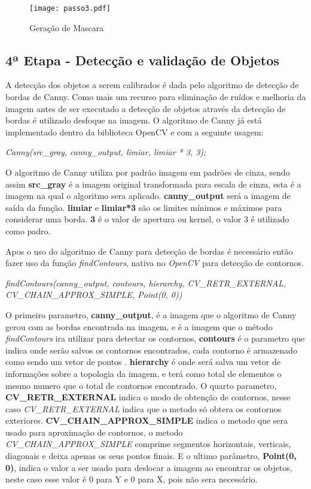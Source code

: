 \begin{figure}[H]
			\centering
			\texttt{[image: passo3.pdf]}
			\caption{Geração de Mascara}
			\label{Configuracao}
		\end{figure}		


\subsection{4ª Etapa - Detecção e validação de Objetos}
A detecção dos objetos a serem calibrados é dada pelo algoritmo de detecção de bordas de Canny. Como mais um recurso para eliminação de ruídos e melhoria da imagem antes de ser executado a detecção de objetos através da detecção de bordas é utilizado desfoque na imagem. O algoritmo de Canny já está implementado dentro da biblioteca OpenCV e com a seguinte usagem:
\begin{center}
\centering \textit{  Canny(src\_gray, canny\_output, limiar, limiar * 3, 3);}
\end{center}
O algoritmo de Canny utiliza por padrão imagem em padrões de cinza, sendo assim \textbf{src\_gray} é a imagem original transformada para escala de cinza, esta é a imagem na qual o algoritmo sera aplicado. \textbf{canny\_output} será a imagem de saída da função.
\textbf{limiar} e \textbf{limiar*3} são os limites mínimos e máximos para considerar uma borda. \textbf{3} é o valor de apertura ou kernel, o valor 3 é utilizado como padro.

Apos o uso do algoritmo de Canny para detecção de bordas é necessário então fazer uso da função \textit{findContours}, nativa no \textit{OpenCV} para detecção de contornos.
\begin{center}
\centering \textit{ findContours(canny\_output, contours, hierarchy, CV\_RETR\_EXTERNAL, CV\_CHAIN\_APPROX\_SIMPLE, Point(0, 0))}
\end{center}

O primeiro parametro, \textbf{canny\_output}, é a imagem que o algoritmo de Canny gerou com as bordas encontrada na imagem, e é a imagem que o método \textit{findContours} ira utilizar para detectar os contornos, \textbf{contours} é o parametro que indica onde serão salvos os contornos encontrados, cada contorno é armazenado como sendo um vetor de pontos \cite{OpenCV}. \textbf{hierarchy} é onde será salva um vetor de informações sobre a topologia da imagem, e terá como total de elementos o mesmo numero que o total de contornos encontrado\cite{OpenCV}. O quarto parametro, \textbf{CV\_RETR\_EXTERNAL} indica o modo de obtenção de contornos, nesse caso \textit{CV\_RETR\_EXTERNAL} indica que o metodo só obtera os contornos exteriores\cite{OpenCV}. \textbf{CV\_CHAIN\_APPROX\_SIMPLE} indica o metodo que sera usado para aproximação de contornos, o metodo \textit{CV\_CHAIN\_APPROX\_SIMPLE} comprime segmentos horizontais, verticais, diagonais e deixa apenas os seus pontos finais\cite{OpenCV}. E o ultimo parâmetro, \textbf{Point(0, 0)}, indica o valor a ser usado para deslocar a imagem ao encontrar os objetos, neste caso esse valor é 0 para Y e 0 para X, pois não sera necessário. 

